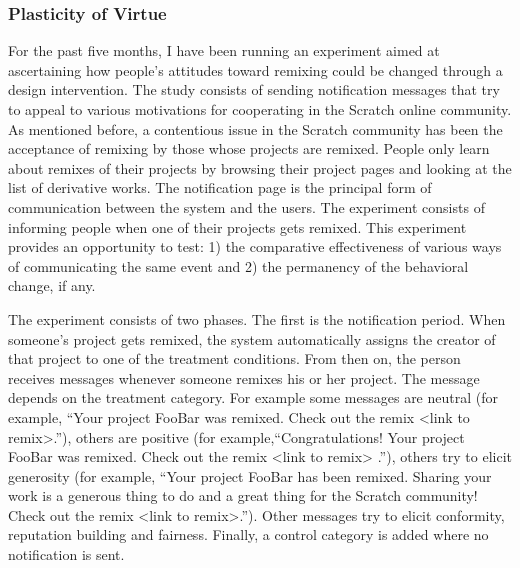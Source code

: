 
\subsubsection{Plasticity of Virtue}

For the past five months, I have been running an experiment aimed at ascertaining how people's attitudes toward remixing could be changed through a design intervention.
The study consists of sending notification messages that try to appeal to various motivations for cooperating in the Scratch online community. 
As mentioned before, a contentious issue in the Scratch community has been the acceptance of remixing by those whose projects are remixed. 
People only learn about remixes of their projects by browsing their project pages and looking at the list of derivative works. 
The notification page is the principal form of communication between the system and the users.
The experiment consists of informing people when one of their projects gets remixed.
This experiment provides an opportunity to test: 1) the comparative effectiveness of various ways of communicating the same event and 2) the permanency of the behavioral change, if any. 

The experiment consists of two phases.
The first is the notification period. 
When someone's project gets remixed, the system automatically assigns the creator of that project to one of the treatment conditions. 
From then on, the person receives messages whenever someone remixes his or her project. The message depends on the treatment category.
For example some messages are neutral (for example, ``Your project FooBar was remixed. Check out the remix <link to remix>.''), 
others are positive (for example,``Congratulations! Your project FooBar was remixed. Check out the remix <link to remix> .''),
others try to elicit generosity (for example, ``Your project FooBar has been remixed. Sharing your work is a generous thing to do and a great thing for the Scratch community! Check out the remix <link to remix>.'').
Other messages try to elicit conformity, reputation building and fairness.
Finally, a control category is added where no notification is sent.

